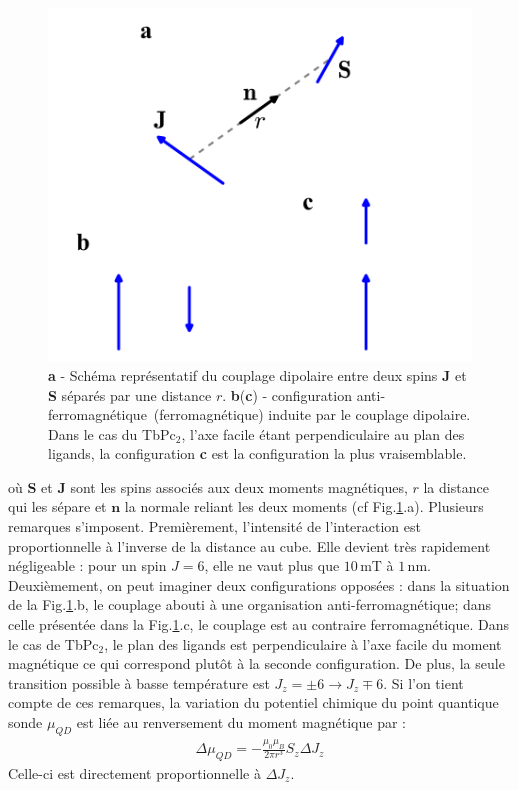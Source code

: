 \begin{figure}
\parbox{6.5cm}{
\includegraphics[scale=0.45]{Resultats/CDipolaire/CDipolaire.pdf} 
}
\parbox{7cm}{\caption{\textbf{a} - Schéma représentatif du couplage dipolaire entre deux spins \textbf{J} et \textbf{S} séparés par une distance $r$. \textbf{b}(\textbf{c}) - configuration anti-ferromagnétique~(ferromagnétique) induite par le couplage dipolaire. Dans le cas du TbPc$_2$, l'axe facile étant perpendiculaire au plan des ligands, la configuration \textbf{c} est la configuration la plus vraisemblable.}
\label{dipolaire}
}

\end{figure}

où $\mathbf{S}$ et $\mathbf{J}$ sont les spins associés aux deux moments magnétiques, $r$ la distance qui les sépare et $\mathbf{n}$ la normale reliant les deux moments (cf Fig.\ref{dipolaire}.a). Plusieurs remarques s'imposent. Premièrement, l'intensité de l'interaction est proportionnelle à l'inverse de la distance au cube. Elle devient très rapidement négligeable : pour un spin $J=6$, elle ne vaut plus que $10$\,mT à $1$\,nm. Deuxièmement, on peut imaginer deux configurations opposées : dans la situation de la Fig.\ref{dipolaire}.b, le couplage abouti à une organisation anti-ferromagnétique; dans celle présentée dans la Fig.\ref{dipolaire}.c, le couplage est au contraire ferromagnétique. Dans le cas de TbPc$_2$, le plan des ligands est perpendiculaire à l'axe facile du moment magnétique ce qui correspond plutôt à la seconde configuration. De plus, la seule transition possible à basse température est $J_z=\pm6 \rightarrow J_z \mp 6$. Si l'on tient compte de ces remarques, la variation du potentiel chimique du point quantique sonde $\mu_{QD}$ est liée au renversement du moment magnétique par :
\begin{eqnarray}
\Delta \mu_{QD} = -\frac{\mu_0 \mu_B}{2\pi r^3}S_z\Delta J_z\nonumber
\end{eqnarray}
Celle-ci est directement proportionnelle à $\Delta J_z$.


